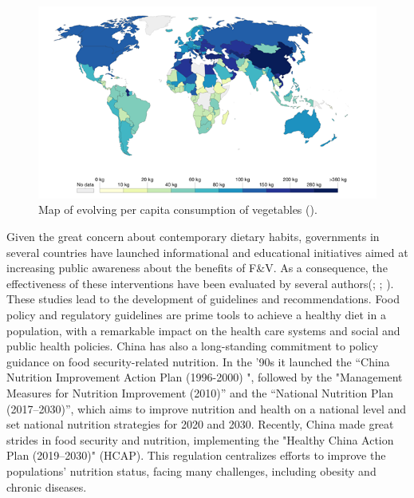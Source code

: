 \documentclass[a4,12pt]{article}
\begin{document}
\begin{figure}[H]
		\centering
		\includegraphics[width=.9\linewidth]{mondo}
		\caption{Map of evolving per capita consumption of vegetables (\cite{FAO17}).}
		\label{fig:mondo}
\end{figure}

Given the great concern about contemporary dietary habits, governments in several countries have launched informational and educational initiatives aimed at increasing public awareness about the benefits of F\&V. As a consequence, the effectiveness of these interventions have been evaluated by several authors(\cite{Seiders04}; \cite{Gordon06}; \cite{Mazzocchi09}). These studies lead to the development of guidelines and recommendations. Food policy and regulatory guidelines are prime tools to achieve a healthy diet in a population, with a remarkable impact on the health care systems and social and public health policies. 
China has also a long-standing commitment to policy guidance on food security-related nutrition. In the ’90s it launched the “China Nutrition Improvement Action Plan (1996-2000) \cite{HCAP}", followed by the "Management Measures for Nutrition Improvement (2010)” and the “National Nutrition Plan (2017–2030)”, which aims to improve nutrition and health on a national level and set national nutrition strategies for 2020 and 2030. Recently, China made great strides in food security and nutrition, implementing the "Healthy China Action Plan (2019–2030)" (HCAP). This regulation centralizes efforts to improve the populations’ nutrition status, facing many challenges, including obesity and chronic diseases.
 
\end{document}
